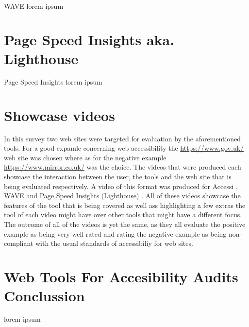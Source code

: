 WAVE \parencite{WAVE_web}
lorem ipsum


\section{Page Speed Insights aka. Lighthouse}

Page Speed Insights \parencite{PSIL}
lorem ipsum


\section{Showcase videos}
In this survey two web sites were targeted for evaluation by the aforementioned tools. For a good expamle concerning web accessibility the \url{https://www.gov.uk/} web site was chosen where as for the negative example \url{https://www.mirror.co.uk/} was the choice. The videos that were produced each showcase the interaction between the user, the tools and the web site that is being evaluated respectively. A video of this format was produced for Accessi \parencite{Accessi_vid}, WAVE \parencite{WAVE_vid} and Page Speed Insights (Lighthouse) \parencite{PageSpeedInsights_vid}. All of these videos showcase the features of the tool that is being covered as well ass highlighting a few extras the tool of each video might have over other tools that might have a different focus. The outcome of all of the videos is yet the same, as they all evaluate the positive example as being very well rated and rating the negative example as being non-compliant with the usual standards of accessibiliy for web sites.

\section{Web Tools For Accesibility Audits Conclussion}

lorem ipsum



